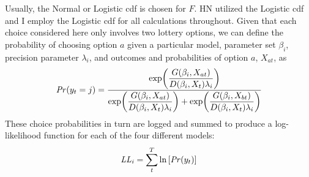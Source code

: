 \documentclass[../main.tex]{subfiles}
\begin{document}
Usually, the Normal or Logistic cdf is chosen for $F$.
HN utilized the Logistic cdf and I employ the Logistic cdf for all calculations throughout.
Given that each choice considered here only involves two lottery options, we can define the probability of choosing option $a$ given a particular model, parameter set $\beta_i$, precision parameter $\lambda_i$, and outcomes and probabilities of option $a$, $X_{at}$, as
\begin{equation}
	\label{eq4:RE.f}
	{\ensuremath{\mathit{Pr}}}(y_t=j) =\dfrac{\exp\!\left( \dfrac{ G(\beta_i,X_{at}) }{ D(\beta_i,X_{t})\lambda_i }  \right)}{  \exp\!\left( \dfrac{ G(\beta_i,X_{at}) }{ D(\beta_i,X_{t})\lambda_i }  \right) + \exp\!\left( \dfrac{ G(\beta_i,X_{bt}) }{ D(\beta_i,X_{t})\lambda_i }  \right)    }
\end{equation}
\noindent These choice probabilities in turn are logged and summed to produce a log-likelihood function for each of the four different models:
\begin{equation}
	\label{eq4:ll}
	\mathit{LL_i} = \sum_{t}^T \ln \left[ {\mathit{Pr}}(y_t) \right]
\end{equation}
\end{document}
